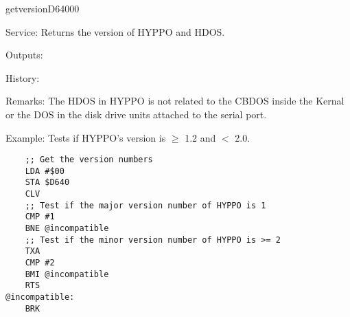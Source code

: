 \newpage
\begin{hyppotrap}{getversion}{D640}{00}
\item [Service:]
  Returns the version of HYPPO and HDOS.
\item [Outputs:]
\item [History:]
\item [Remarks:]
  The HDOS in HYPPO is not related to the CBDOS inside the Kernal or the
  DOS in the disk drive units attached to the serial port.
\item [Example:]
  Tests if HYPPO's version is $\geq$ 1.2 and $<$ 2.0.
\begin{tcolorbox}[colback=black,coltext=white]
\verbatimfont{\codefont}
\begin{verbatim}
    ;; Get the version numbers
    LDA #$00
    STA $D640
    CLV
    ;; Test if the major version number of HYPPO is 1
    CMP #1
    BNE @incompatible
    ;; Test if the minor version number of HYPPO is >= 2
    TXA
    CMP #2
    BMI @incompatible
    RTS
@incompatible:
    BRK
\end{verbatim}
\end{tcolorbox}
\end{hyppotrap}


